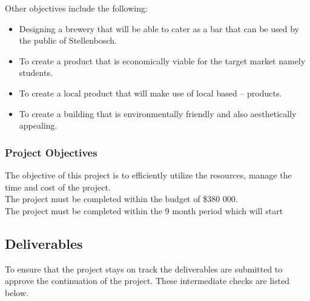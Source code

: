 \noindent
Other objectives include the following:
\begin{itemize}
\item Designing a brewery that will be able to cater as a bar that can be used by the public of Stellenbosch.
\item To create a product that is economically viable for the target market namely students.
\item To create a local product that will make use of local based – products.
\item To create a building that is environmentally friendly and also aesthetically appealing.
\end{itemize}

\subsubsection{Project Objectives}

The objective of this project is to efficiently utilize the resources, manage the time and cost of the project.\\

\noindent
The project must be completed within the budget of \$380 000.\\

\noindent
The project must be completed within the 9 month period which will start

\subsection{Deliverables}

To ensure that the project stays on track the deliverables are submitted to approve the continuation of the project. These intermediate checks are listed below.

